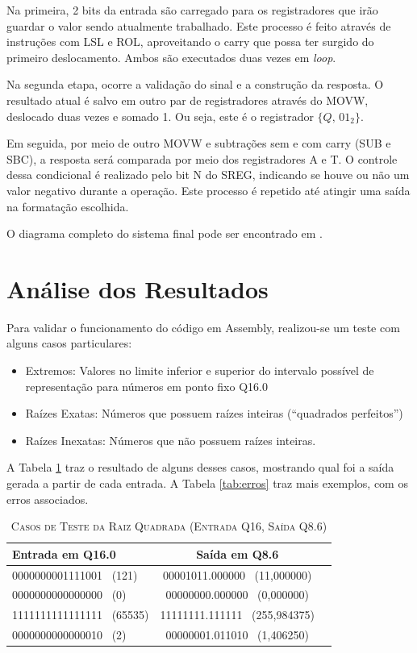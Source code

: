 \documentclass[conference]{IEEEtran}
\begin{document}
Na primeira, 2 bits da entrada são carregado para os registradores que irão guardar o valor sendo atualmente trabalhado. Este processo é feito através de instruções com LSL e ROL, aproveitando o carry que possa ter surgido do primeiro deslocamento. Ambos são executados duas vezes em \textit{loop}. 

Na segunda etapa, ocorre a validação do sinal e a construção da resposta. O resultado atual é salvo em outro par de registradores através do MOVW, deslocado duas vezes e somado 1. Ou seja, este é o registrador $\{Q,\,01_2\}$. 

Em seguida, por meio de outro MOVW e subtrações sem e com carry (SUB e SBC), a resposta será comparada por meio dos registradores A e T. O controle dessa condicional é realizado pelo bit N do SREG, indicando se houve ou não um valor negativo durante a operação. Este processo é repetido até atingir uma saída na formatação escolhida. 

O diagrama completo do sistema final pode ser encontrado em \cite{monteiro_sismicro}.

\section{Análise dos Resultados}
Para validar o funcionamento do código em Assembly, realizou-se um teste com alguns casos particulares:
\begin{itemize}
    \item Extremos: Valores no limite inferior e superior do intervalo possível de representação para números em ponto fixo Q16.0
    \item Raízes Exatas: Números que possuem raízes inteiras (``quadrados perfeitos'')
    \item Raízes Inexatas: Números que não possuem raízes inteiras.
\end{itemize}

A Tabela \ref{tabela_teste} traz o resultado de alguns desses casos, mostrando qual foi a saída gerada a partir de cada entrada. A Tabela \ref{tab:erros} traz mais exemplos, com os erros associados.

\begin{table}[htbp]
\centering
\caption{\textsc{Casos de Teste da Raiz Quadrada (Entrada Q16, Saída Q8.6)}}
\label{tabela_teste}
\begin{tabular}{lcc}
\hline
\textbf{Entrada em Q16.0} & \textbf{Saída em Q8.6} \\
\hline
0000000001111001 \ (121)   & 00001011.000000 \ (11{,}000000) \\
0000000000000000 \ (0)     & 00000000.000000 \ (0{,}000000) \\
1111111111111111 \ (65535) & 11111111.111111 \ (255{,}984375) \\
0000000000000010 \ (2)     & 00000001.011010 \ (1{,}406250) \\
\hline
\end{tabular}
\end{table}
\end{document}
